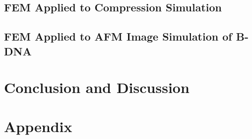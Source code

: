 \documentclass[11pt,a4paper]{article}
\begin{document}
\subsection{FEM Applied to Compression Simulation}


\newpage
\subsection{FEM Applied to AFM Image Simulation of B-DNA}


\newpage
\section{Conclusion and Discussion}





\newpage
{}
\printbibliography

\newpage
\section*{Appendix}
\appendix


% 
% 

\end{document}
